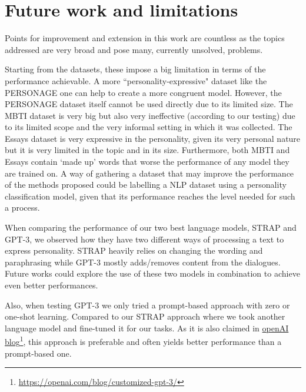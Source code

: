 \documentclass[nomenclature, english, biblatex]{kththesis}
\begin{document}
\section{Future work and limitations}
Points for improvement and extension in this work are countless as the topics addressed are very broad and pose many, currently unsolved, problems.

Starting from the datasets, these impose a big limitation in terms of the performance achievable. A more ``personality-expressive" dataset like the PERSONAGE one can help to create a more congruent model. However, the PERSONAGE dataset itself cannot be used directly due to its limited size. The MBTI dataset is very big but also very ineffective (according to our testing) due to its limited scope and the very informal setting in which it was collected. The Essays dataset is very expressive in the personality, given its very personal nature but it is very limited in the topic and in its size. Furthermore, both MBTI and Essays contain `made up' words that worse the performance of any model they are trained on. A way of gathering a dataset that may improve the performance of the methods proposed could be labelling a \gls{NLP} dataset using a personality classification model, given that its performance reaches the level needed for such a process.

When comparing the performance of our two best language models, STRAP and GPT-3, we observed how they have two different ways of processing a text to express personality. STRAP heavily relies on changing the wording and paraphrasing while GPT-3 mostly adds/removes content from the dialogues. Future works could explore the use of these two models in combination to achieve even better performances.

Also, when testing GPT-3 we only tried a prompt-based approach with zero or one-shot learning. Compared to our STRAP approach where we took another language model and fine-tuned it for our tasks. As it is also claimed in \href{https://openai.com/blog/customized-gpt-3/}{openAI blog}\footnote{\url{https://openai.com/blog/customized-gpt-3/}}, this approach is preferable and often yields better performance than a prompt-based one.
\end{document}
